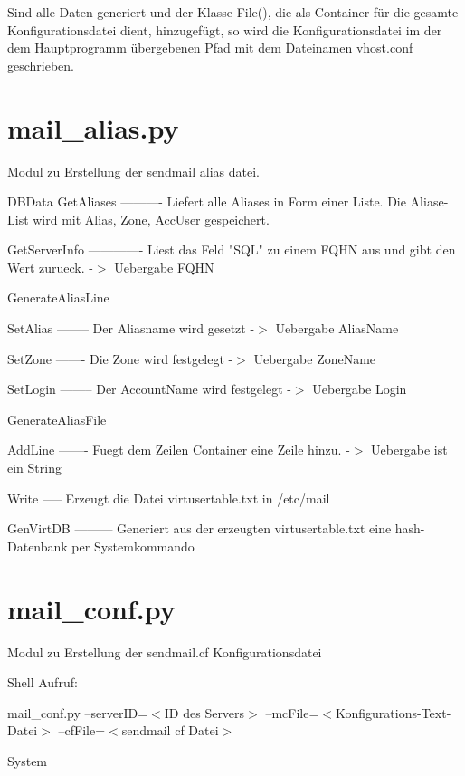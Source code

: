 Sind alle Daten generiert und der Klasse File(), die als Container
f\"ur die gesamte Konfigurationsdatei dient, hinzugef\"ugt, so wird
die Konfigurationsdatei im der dem Hauptprogramm \"ubergebenen Pfad
mit dem Dateinamen vhost.conf geschrieben.

\section{mail\_alias.py}

Modul zu Erstellung der sendmail alias datei.

DBData
        GetAliases
        ----------
        Liefert alle Aliases in Form einer Liste.
        Die Aliase-List wird mit Alias, Zone, AccUser gespeichert.

        GetServerInfo
        -------------
        Liest das Feld "SQL" zu einem FQHN aus und gibt den Wert zurueck.
        -$>$ Uebergabe FQHN


GenerateAliasLine

        SetAlias
        --------
        Der Aliasname wird gesetzt
        -$>$ Uebergabe AliasName
        
        SetZone
        -------
        Die Zone wird festgelegt
        -$>$ Uebergabe ZoneName

        SetLogin
        --------
        Der AccountName wird festgelegt
        -$>$ Uebergabe Login

GenerateAliasFile

        AddLine
        -------
        Fuegt dem Zeilen Container eine Zeile hinzu.
        -$>$ Uebergabe ist ein String

        Write
        -----
        Erzeugt die Datei virtusertable.txt in /etc/mail

        GenVirtDB
        ---------
        Generiert aus der erzeugten virtusertable.txt eine
        hash-Datenbank per Systemkommando

\section{mail\_conf.py}

Modul zu Erstellung der sendmail.cf Konfigurationsdatei

Shell Aufruf:

mail\_conf.py --serverID=$<$ID des Servers$>$
             --mcFile=$<$Konfigurations-Text-Datei$>$
             --cfFile=$<$sendmail cf Datei$>$

System

